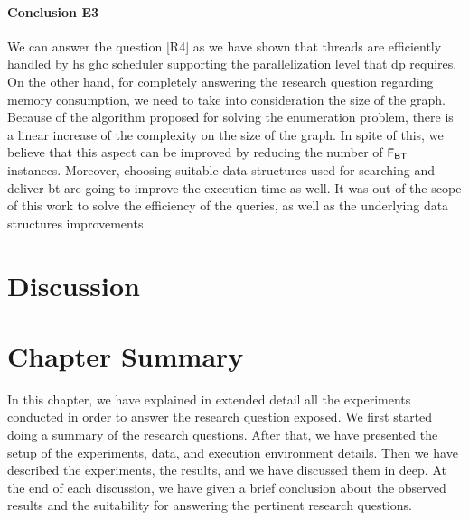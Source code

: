 \paragraph{Conclusion E3} We can answer the question [R4] as we have shown that threads are efficiently handled by \acrshort{hs} \acrshort{ghc} scheduler supporting the parallelization level that \acrshort{dp} requires. 
On the other hand, for completely answering the research question regarding memory consumption, we need to take into consideration the size of the graph.
Because of the algorithm proposed for solving the enumeration problem, there is a linear increase of the complexity on the size of the graph. In spite of this, we believe that this aspect can be improved by reducing the number of $\mathsf{F_{BT}}$ instances. Moreover, choosing suitable data structures used for searching and deliver \acrshort{bt} are going to improve the execution time as well. 
It was out of the scope of this work to solve the efficiency of the queries, as well as the underlying data structures improvements. 

\section{Discussion}\label{sec:exp:discussion}

\section{Chapter Summary}
In this chapter, we have explained in extended detail all the experiments conducted in order to answer the research question exposed.
We first started doing a summary of the research questions. After that, we have presented the setup of the experiments, data, and execution environment details.
Then we have described the experiments, the results, and we have discussed them in deep. At the end of each discussion, we have given a brief conclusion about the observed results and the suitability for answering the pertinent research questions.

